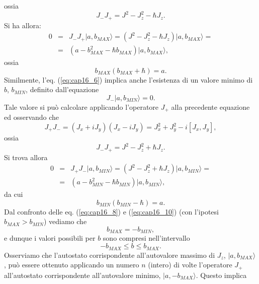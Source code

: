 \documentclass[a4paper,12pt,oneside]{book}
\begin{document}
ossia 
\begin{equation}
J_-J_+ = J^2 -J_z ^2 -\hbar J_z .
\label{eq:cap16_7}
\end{equation}
Si ha allora:
\begin{eqnarray}
0&=&J_{-}J_{+} \vert a, b_{MAX} \rangle = (J^2 -J_z ^2 -\hbar J_z)\vert a, b_{MAX} \rangle = \nonumber \\
&=&(a- b_{MAX} ^2 - \hbar b_{MAX} )\vert a, b_{MAX} \rangle,
\end{eqnarray}
ossia
\begin{equation}
b_{MAX}(b_{MAX}+\hbar) =a .
\label{eq:cap16_8}
\end{equation}
Similmente, l'eq. (\ref{eq:cap16_6}) implica anche l'esistenza di un valore minimo di $b$,  $b_{MIN}$, definito dall'equazione
\begin{equation}
J_{-} \vert a, b_{MIN} \rangle =0.
\end{equation}
Tale valore si può calcolare applicando l'operatore $J_+$ alla precedente equazione ed osservando che
\begin{equation}
J_+J_- = (J_x+iJ_y)(J_x-iJ_y)= J_x^2 +J_y ^2-i[J_x, J_y] ,
\end{equation}
ossia
\begin{equation}
J_-J_+ = J^2 -J_z ^2 +\hbar J_z .
\label{eq:cap16_9}
\end{equation}
Si trova allora
\begin{eqnarray}
0&=&J_{+}J_{-} \vert a, b_{MIN} \rangle = (J^2 -J_z ^2 +\hbar J_z)\vert a, b_{MIN} \rangle = \nonumber \\
&=&(a- b_{MIN} ^2 - \hbar b_{MIN} )\vert a, b_{MIN} \rangle ,
\end{eqnarray}
da cui
\begin{equation}
b_{MIN}(b_{MIN}-\hbar) =a .
\label{eq:cap16_10}
\end{equation}
Dal confronto delle eq. (\ref{eq:cap16_8}) e (\ref{eq:cap16_10}) (con l'ipotesi $b_{MAX} > b_{MIN}$) vediamo che
\begin{equation}
b_{MAX} = - b_{MIN} ,
\end{equation}
e dunque i valori possibili per $b$ sono compresi nell'intervallo
\begin{equation}
-b_{MAX} \leq b \leq b_{MAX} .
\end{equation}
Osserviamo che l'autostato corrispondente all'autovalore massimo di $J_z$, $\vert a, b_{MAX}\rangle$, può essere ottenuto applicando un numero $n$ (intero) di volte l'operatore $J_+$ all'autostato corrispondente all'autovalore minimo, $\vert a, - b_{MAX}\rangle $. Questo implica
\end{document}
